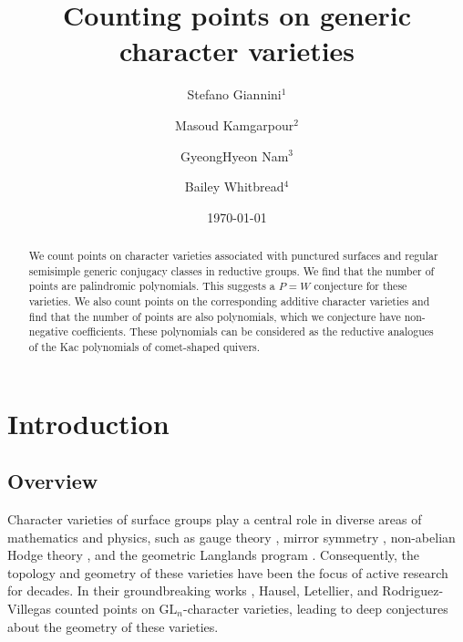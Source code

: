 \documentclass[12pt]{amsart}
\date{\today}
\theoremstyle{plain}
\theoremstyle{definition}
\theoremstyle{remark}
\newcommand{\GL}{\mathrm{GL}}
\begin{document}
 
\title{Counting points on generic character varieties}

\author{Stefano Giannini$^1$}
\author{Masoud Kamgarpour$^2$}
\author{GyeongHyeon Nam$^3$}
\author{Bailey Whitbread$^4$}

\address{$^1$School of Computer and Mathematical Sciences, The University of Adelaide, Australia}

\address{$^2$School of Mathematics and Physics, The University of Queensland, Australia}

\address{$^3$Department of Mathematics and System Analysis, Aalto University, Finland}

\address{$^4$School of Mathematics and Statistics, The University of Sydney, Australia}

\begin{abstract} We count points on character varieties  associated with punctured surfaces and regular semisimple generic conjugacy classes in reductive groups. We find that the number of points are palindromic polynomials. This suggests a $P=W$ conjecture for these varieties. We also count points on the corresponding additive character varieties and find that the number of points are also polynomials, which we conjecture have non-negative coefficients. These polynomials can be considered as the reductive analogues of the Kac polynomials of comet-shaped quivers. 
\end{abstract} 



\maketitle

\tableofcontents

\section{Introduction} 
\subsection{Overview} 
 
 Character varieties of surface groups play a central role in diverse areas of mathematics and physics, such as gauge theory \cite{AtiyahBott83, HitchinProceedingofLMS87}, mirror symmetry \cite{HauselThaddeusInventiones2003}, non-abelian Hodge theory \cites{Simpson92, Simpson94i}, and the geometric Langlands program \cites{BeilinsonDrinfeld, BenZviNadler}. Consequently, the topology and geometry of these varieties have been the focus of active research for decades. In their groundbreaking works \cite{HRV08, HLRV11}, Hausel, Letellier, and Rodriguez-Villegas counted points on $\GL_n$-character varieties,  leading to deep conjectures about the geometry of these varieties. 
 
\end{document}
